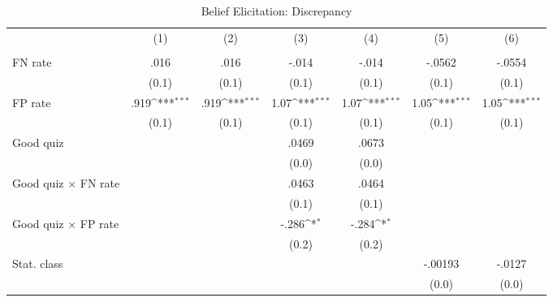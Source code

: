 \begin{table}[htbp]\centering
\def\sym#1{\ifmmode^{#1}\else\(^{#1}\)\fi}
\caption{Belief Elicitation: Discrepancy}
\begin{tabular}{l*{6}{c}}
\hline\hline
                &\multicolumn{1}{c}{(1)}&\multicolumn{1}{c}{(2)}&\multicolumn{1}{c}{(3)}&\multicolumn{1}{c}{(4)}&\multicolumn{1}{c}{(5)}&\multicolumn{1}{c}{(6)}\\
                &\multicolumn{1}{c}{}&\multicolumn{1}{c}{}&\multicolumn{1}{c}{}&\multicolumn{1}{c}{}&\multicolumn{1}{c}{}&\multicolumn{1}{c}{}\\
\hline
FN rate         &     .016         &     .016         &    -.014         &    -.014         &   -.0562         &   -.0554         \\
                &    (0.1)         &    (0.1)         &    (0.1)         &    (0.1)         &    (0.1)         &    (0.1)         \\
FP rate         &     .919\sym{***}&     .919\sym{***}&     1.07\sym{***}&     1.07\sym{***}&     1.05\sym{***}&     1.05\sym{***}\\
                &    (0.1)         &    (0.1)         &    (0.1)         &    (0.1)         &    (0.1)         &    (0.1)         \\
Good quiz       &                  &                  &    .0469         &    .0673         &                  &                  \\
                &                  &                  &    (0.0)         &    (0.0)         &                  &                  \\
Good quiz $\times$ FN rate&                  &                  &    .0463         &    .0464         &                  &                  \\
                &                  &                  &    (0.1)         &    (0.1)         &                  &                  \\
Good quiz $\times$ FP rate&                  &                  &    -.286\sym{*}  &    -.284\sym{*}  &                  &                  \\
                &                  &                  &    (0.2)         &    (0.2)         &                  &                  \\
Stat. class     &                  &                  &                  &                  &  -.00193         &   -.0127         \\
                &                  &                  &                  &                  &    (0.0)         &    (0.0)         \\

\end{tabular}
\end{table}
